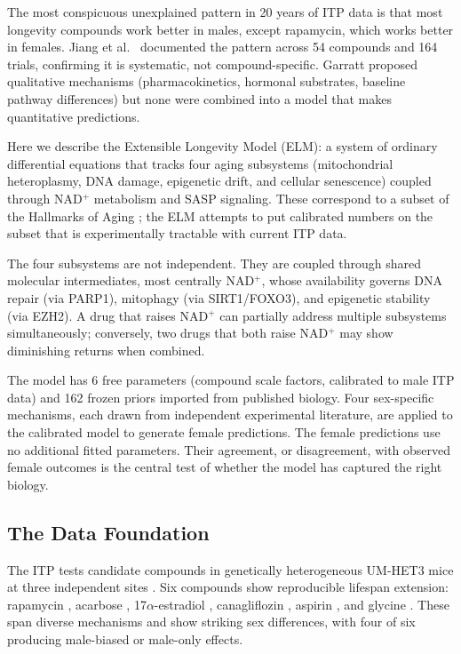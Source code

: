 \documentclass[11pt]{article}
\begin{document}
The most conspicuous unexplained pattern in 20 years of ITP data is that most longevity compounds work better in males, except rapamycin, which works better in females. Jiang et al.\ \citep{Jiang2025} documented the pattern across 54 compounds and 164 trials, confirming it is systematic, not compound-specific. Garratt \citep{Garratt2020} proposed qualitative mechanisms (pharmacokinetics, hormonal substrates, baseline pathway differences) but none were combined into a model that makes quantitative predictions.

Here we describe the Extensible Longevity Model (ELM): a system of ordinary differential equations that tracks four aging subsystems (mitochondrial heteroplasmy, DNA damage, epigenetic drift, and cellular senescence) coupled through NAD$^+$ metabolism and SASP signaling. These correspond to a subset of the Hallmarks of Aging \citep{LopezOtin2013,LopezOtin2023}; the ELM attempts to put calibrated numbers on the subset that is experimentally tractable with current ITP data.

The four subsystems are not independent. They are coupled through shared molecular intermediates, most centrally NAD$^+$, whose availability governs DNA repair (via PARP1), mitophagy (via SIRT1/FOXO3), and epigenetic stability (via EZH2). A drug that raises NAD$^+$ can partially address multiple subsystems simultaneously; conversely, two drugs that both raise NAD$^+$ may show diminishing returns when combined.

The model has 6 free parameters (compound scale factors, calibrated to male ITP data) and 162 frozen priors imported from published biology. Four sex-specific mechanisms, each drawn from independent experimental literature, are applied to the calibrated model to generate female predictions. The female predictions use no additional fitted parameters. Their agreement, or disagreement, with observed female outcomes is the central test of whether the model has captured the right biology.

\subsection{The Data Foundation}

The ITP tests candidate compounds in genetically heterogeneous UM-HET3 mice at three independent sites \citep{Miller2007,Strong2008,Harrison2009}. Six compounds show reproducible lifespan extension: rapamycin \citep{Miller2011rapa}, acarbose \citep{Harrison2014}, 17$\alpha$-estradiol \citep{Stout2017}, canagliflozin \citep{Miller2020}, aspirin \citep{Strong2016}, and glycine \citep{Miller2019glycine}. These span diverse mechanisms and show striking sex differences, with four of six producing male-biased or male-only effects.
\end{document}

